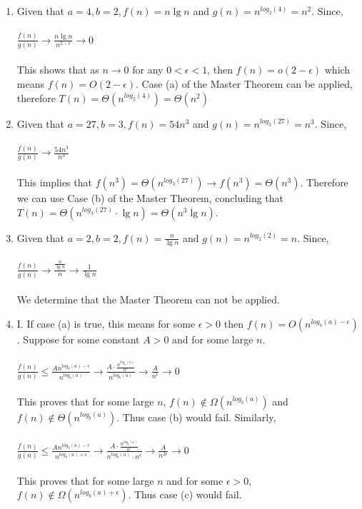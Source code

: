 \documentclass{article}%
\begin{document}
\begin{enumerate}
\item Given that $a=4, b=2, f(n)=n\lg n$ and $g(n)=n^{log_{2}(4)}=n^{2}$. Since,\\\\
$\frac{f(n)}{g(n)} \rightarrow \frac{n\lg n}{n^{2-\epsilon}} \rightarrow 0$
\\\\This shows that as $n \rightarrow 0$ for any $0 < \epsilon < 1$, then $f(n)=o(2-\epsilon)$ which means $f(n) = O(2-\epsilon)$. Case (a) of the Master Theorem can be applied, therefore $T(n)= \Theta(n^{log_2(4)}) = \Theta(n^{2})$

\item Given that $a=27, b=3, f(n)=54n^3$ and $g(n)=n^{log_3(27)} = n^{3}$. Since,\\\\
$\frac{f(n)}{g(n)} \rightarrow \frac{54n^3}{n^{3}}$\\\\
This implies that $f(n^3)=\Theta(n^{log_3(27)}) \rightarrow f(n^3) = \Theta(n^3)$. Therefore we can use Case (b) of the Master Theorem, concluding that $T(n) = \Theta(n^{log_3(27)} \cdot \lg n) = \Theta(n^3 \lg n)$.

\item Given that $a=2, b=2, f(n)=\frac{n}{\lg n}$ and $g(n)=n^{log_2(2)}=n$. Since,\\\\
$\frac{f(n)}{g(n)} \rightarrow \frac{\frac{n}{\lg n}}{n} \rightarrow \frac{1}{\lg n}$
\\\\We determine that the Master Theorem can not be applied.

\item I. If case (a) is true, this means for some $\epsilon > 0$ then $f(n) = O(n^{log_{b}(a)-\epsilon})$. Suppose for some constant $A > 0$ and for some large $n$. \\\\
$\frac{f(n)}{g(n)} \leq \frac{An^{log_{b}(a)-\epsilon}}{n^{log_{b}(a)}} \rightarrow \frac{A \cdot \frac{n^{log_b(a)}}{n^\epsilon}}{n^{log_b(a)}} \rightarrow 
\frac{A}{n^{\epsilon}} \rightarrow 0$ \\\\
This proves that for some large $n$, $f(n) \not\in \Omega(n^{log_{b}(a)})$ and $f(n) \not\in \Theta(n^{log_{b}(a)})$. Thus case (b) would fail. Similarly,\\\\
$\frac{f(n)}{g(n)} \leq \frac{An^{log_b(a)-\epsilon}}{n^{log_b(a)+\epsilon}} \rightarrow \frac{A \cdot \frac{n^{log_b(a)}}{n^\epsilon}}{n^{log_b(a)} \cdot n^\epsilon}
\rightarrow \frac{A}{n^{2\epsilon}} \rightarrow 0$ \\\\
This proves that for some large $n$ and for some $\epsilon>0$, $f(n) \not\in \Omega(n^{log_b(a)+\epsilon})$. Thus case (c) would fail.\\\\


\end{enumerate}
\end{document}
